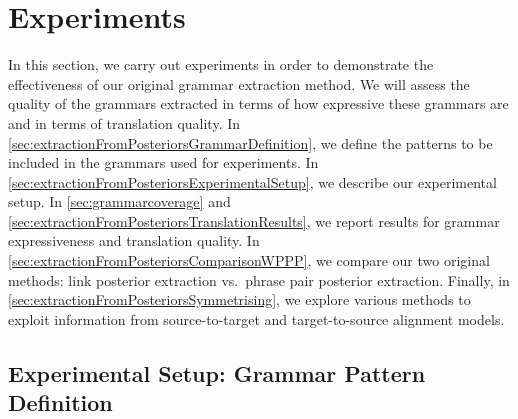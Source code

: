 \section{Experiments}
\label{sec:extractionFromPosteriorsExperiments}

In this section, we carry out experiments in order to demonstrate
the effectiveness of our original grammar extraction method. We will
assess the quality of the grammars extracted in terms of how expressive
these grammars are and in terms of translation quality.
In \autoref{sec:extractionFromPosteriorsGrammarDefinition}, we
define the patterns to be included in the grammars used for experiments.
In \autoref{sec:extractionFromPosteriorsExperimentalSetup}, we describe
our experimental setup. In \autoref{sec:grammarcoverage} and
\autoref{sec:extractionFromPosteriorsTranslationResults}, we report
results for grammar expressiveness and translation quality.
In \autoref{sec:extractionFromPosteriorsComparisonWPPP}, we compare
our two original methods: link posterior extraction vs.\ phrase pair posterior
extraction. Finally, in \autoref{sec:extractionFromPosteriorsSymmetrising},
we explore various methods to exploit information from source-to-target and
target-to-source alignment models.

\subsection{Experimental Setup: Grammar Pattern Definition}
\label{sec:extractionFromPosteriorsGrammarDefinition}

